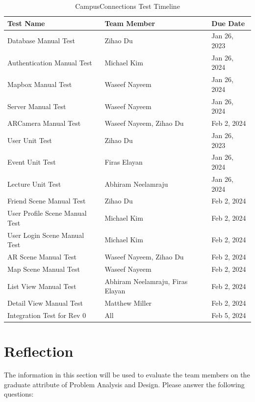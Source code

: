 \documentclass[12pt, titlepage]{article}
\begin{document}
\begin{table}[H]
\centering
\begin{tabular}{p{} p{}  p{}}
\toprule
Test Name & Team Member & Due Date \\
\midrule
Database Manual Test & Zihao Du & Jan 26, 2023\\
Authentication Manual Test & Michael Kim & Jan 26, 2024\\
Mapbox Manual Test & Waseef Nayeem & Jan 26, 2024\\
Server Manual Test & Waseef Nayeem & Jan 26, 2024\\
ARCamera Manual Test &Waseef Nayeem, Zihao Du & Feb 2, 2024\\
User Unit Test & Zihao Du & Jan 26, 2023\\
Event Unit Test & Firas Elayan & Jan 26, 2024\\
Lecture Unit Test & Abhiram Neelamraju & Jan 26, 2024\\
Friend Scene Manual Test & Zihao Du & Feb 2, 2024\\
User Profile Scene Manual Test & Michael Kim & Feb 2, 2024\\
User Login Scene Manual Test & Michael Kim & Feb 2, 2024\\
AR Scene Manual Test & Waseef Nayeem, Zihao Du & Feb 2, 2024\\
Map Scene Manual Test & Waseef Nayeem & Feb 2, 2024\\
List View Manual Test & Abhiram Neelamraju, Firas Elayan & Feb 2, 2024\\
Detail View Manual Test & Matthew Miller & Feb 2, 2024\\
Integration Test for Rev 0 & All & Feb 5, 2024\\
\bottomrule
\end{tabular}
\caption{CampusConnections Test Timeline}
\end{table}
\newpage{}

\appendix

\section{Reflection}

The information in this section will be used to evaluate the team members on the
graduate attribute of Problem Analysis and Design.  Please answer the following questions:
\end{document}
